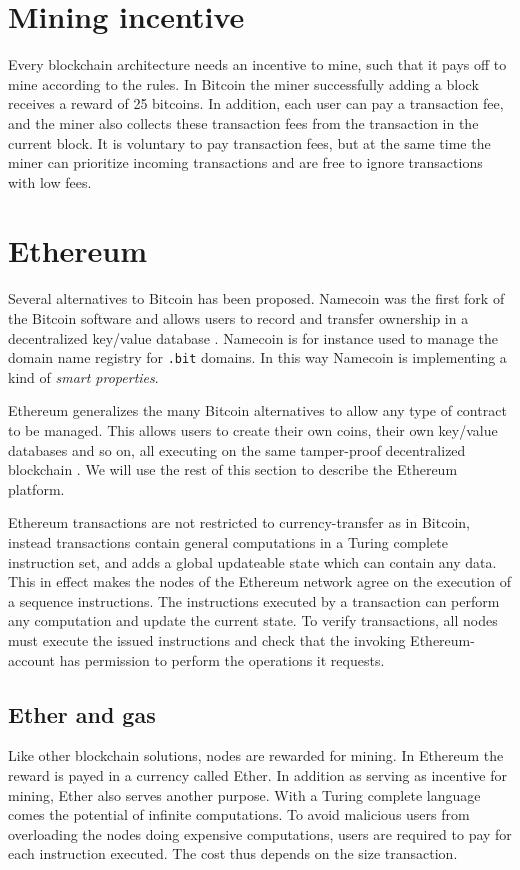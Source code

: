 \documentclass[oneside,a4paper,10pts,article]{memoir}
\begin{document}
\section{Mining incentive}
Every blockchain architecture needs an incentive to mine, such that it
pays off to mine according to the rules. In Bitcoin the miner
successfully adding a block receives a reward of 25 bitcoins. In
addition, each user can pay a transaction fee, and the miner also
collects these transaction fees from the transaction in the current
block. It is voluntary to pay transaction fees, but at the same time
the miner can prioritize incoming transactions and are free to ignore
transactions with low fees.

\section{Ethereum}
Several alternatives to Bitcoin has been proposed. Namecoin was the
first fork of the Bitcoin software and allows users to record and
transfer ownership in a decentralized key/value database
\cite{namecoin}. Namecoin is for instance used to manage the domain
name registry for \texttt{.bit} domains. In this way Namecoin is
implementing a kind of \textit{smart properties}.

Ethereum generalizes the many Bitcoin alternatives to allow any type
of contract to be managed. This allows users to create their own
coins, their own key/value databases and so on, all executing on the
same tamper-proof decentralized blockchain \cite{buterin2013ethereum,
  wood2014ethereum}. We will use the rest of this section to describe
the Ethereum platform.

Ethereum transactions are not restricted to currency-transfer as in
Bitcoin, instead transactions contain general computations in a Turing
complete instruction set, and adds a global updateable state which can
contain any data. This in effect makes the nodes of the Ethereum
network agree on the execution of a sequence instructions. The
instructions executed by a transaction can perform any computation and
update the current state. To verify transactions, all nodes must
execute the issued instructions and check that the invoking
Ethereum-account has permission to perform the operations it requests.

\subsection{Ether and gas}
Like other blockchain solutions, nodes are rewarded for mining. In
Ethereum the reward is payed in a currency called Ether. In addition
as serving as incentive for mining, Ether also serves another
purpose. With a Turing complete language comes the potential of
infinite computations. To avoid malicious users from overloading the
nodes doing expensive computations, users are required to pay for each
instruction executed. The cost thus depends on the size transaction.
\end{document}
